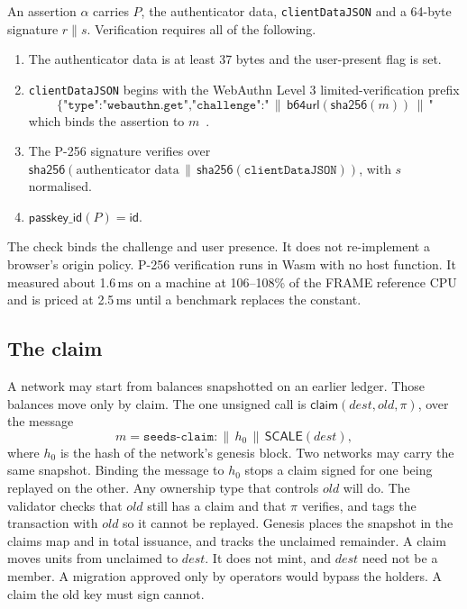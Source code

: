 \documentclass[11pt,a4paper]{article}
\theoremstyle{definition}
\theoremstyle{plain}
\theoremstyle{remark}
\newcommand{\id}{\mathsf{id}}
\begin{document}
An assertion $\alpha$ carries $P$, the authenticator data, \texttt{clientDataJSON} and a 64-byte signature $r \| s$. Verification requires all of the following.

\begin{enumerate}
  \item The authenticator data is at least 37 bytes and the user-present flag is set.
  \item \texttt{clientDataJSON} begins with the WebAuthn Level 3 limited-verification prefix
  \[
    \texttt{\{"type":"webauthn.get","challenge":"} \,\|\, \mathsf{b64url}(\mathsf{sha256}(m)) \,\|\, \texttt{"}
  \]
  which binds the assertion to $m$~\cite{webauthn2025}.
  \item The P-256 signature verifies over $\mathsf{sha256}(\text{authenticator data} \,\|\, \mathsf{sha256}(\texttt{clientDataJSON}))$, with $s$ normalised.
  \item $\mathsf{passkey\_id}(P) = \id$.
\end{enumerate}

The check binds the challenge and user presence. It does not re-implement a browser's origin policy. P-256 verification runs in Wasm with no host function. It measured about 1.6\,ms on a machine at 106--108\% of the FRAME reference CPU and is priced at 2.5\,ms until a benchmark replaces the constant.

\subsection{The claim}

A network may start from balances snapshotted on an earlier ledger. Those balances move only by claim. The one unsigned call is $\mathsf{claim}(\mathit{dest}, \mathit{old}, \pi)$, over the message
\[
  m = \texttt{seeds-claim:} \,\|\, h_0 \,\|\, \mathsf{SCALE}(\mathit{dest}),
\]
where $h_0$ is the hash of the network's genesis block. Two networks may carry the same snapshot. Binding the message to $h_0$ stops a claim signed for one being replayed on the other.
Any ownership type that controls $\mathit{old}$ will do. The validator checks that $\mathit{old}$ still has a claim and that $\pi$ verifies, and tags the transaction with $\mathit{old}$ so it cannot be replayed. Genesis places the snapshot in the claims map and in total issuance, and tracks the unclaimed remainder. A claim moves units from unclaimed to $\mathit{dest}$. It does not mint, and $\mathit{dest}$ need not be a member. A migration approved only by operators would bypass the holders. A claim the old key must sign cannot.
\end{document}
